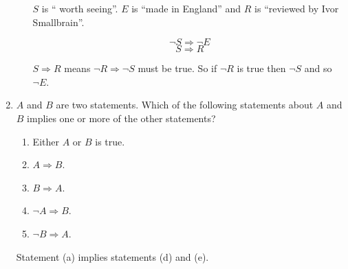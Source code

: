 \documentclass{article}
\begin{document}
\begin{enumerate}
\begin{enumerate}
				$S$ is `` worth seeing''. $E$ is ``made in England'' and $R$ is ``reviewed by Ivor Smallbrain''.
				
				$$\neg S \Rightarrow \neg E$$
				$$S \Rightarrow R$$
				
				$S \Rightarrow R$ means $\neg R \Rightarrow \neg S$ must be true. So if $\neg R$ is true then $\neg S$
				and so $\neg E$.
		\end{enumerate}
		
		\item $A$ and $B$ are two statements. Which of the following statements about $A$ and $B$ implies one or
			more of the other statements?
			
			\begin{enumerate}
				\item Either $A$ or $B$ is true.
				
				\item $A \Rightarrow B$.
				
				\item $B \Rightarrow A$.
				
				\item $\neg A \Rightarrow B$.
				
				\item $\neg B \Rightarrow A$.
			\end{enumerate}
			
			Statement (a) implies statements (d) and (e).
	\end{enumerate}
\end{document}
